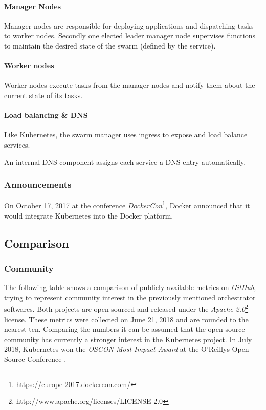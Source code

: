 \paragraph{Manager Nodes}\label{manager-nodes}

Manager nodes are responsible for deploying applications and dispatching
tasks to worker nodes. Secondly one elected leader manager node
supervises functions to maintain the desired state of the swarm (defined
by the service). \cite{dock-swarm}

\paragraph{Worker nodes}\label{worker-nodes}

Worker nodes execute tasks from the manager nodes and notify them about
the current state of its tasks.\cite{dock-swarm}

\paragraph{Load balancing \& DNS}\label{load-balancing-dns}

Like Kubernetes, the swarm manager uses ingress to expose and load
balance services.

An internal DNS component assigns each service a DNS entry
automatically. \cite{dock-swarm}

\subsubsection{Announcements}\label{announcements}

On October 17, 2017 at the conference \emph{DockerCon}\footnote{https://europe-2017.dockercon.com/},
Docker announced that it would integrate Kubernetes into the Docker
platform.

\subsection{Comparison}\label{comparison}

\subsubsection{Community}\label{community}

The following table shows a comparison of publicly available metrics on
\emph{GitHub}, trying to represent community interest in the previously
mentioned orchestrator softwares. Both projects are open-sourced and
released under the \emph{Apache-2.0}\footnote{http://www.apache.org/licenses/LICENSE-2.0}
license. These metrics were collected on June 21, 2018 and are rounded
to the nearest ten. Comparing the numbers it can be assumed that the
open-source community has currently a stronger interest in the
Kubernetes project. In July 2018, Kubernetes won the \emph{OSCON Most
Impact Award} at the O'Reillys Open Source Conference
\cite{heise-oscon}.

